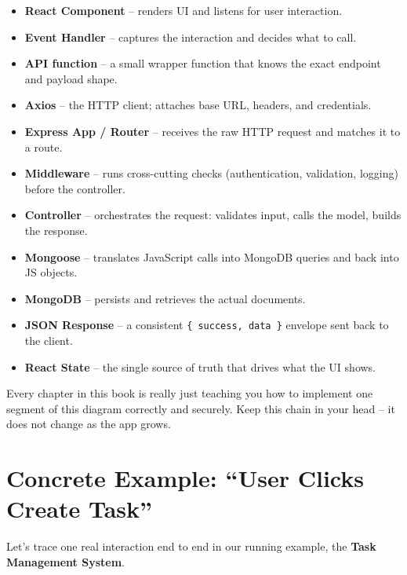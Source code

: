 \begin{itemize}
  \item \textbf{React Component} -- renders UI and listens for user interaction.
  \item \textbf{Event Handler} -- captures the interaction and decides what to call.
  \item \textbf{API function} -- a small wrapper function that knows the exact endpoint and payload shape.
  \item \textbf{Axios} -- the HTTP client; attaches base URL, headers, and credentials.
  \item \textbf{Express App / Router} -- receives the raw HTTP request and matches it to a route.
  \item \textbf{Middleware} -- runs cross-cutting checks (authentication, validation, logging) before the controller.
  \item \textbf{Controller} -- orchestrates the request: validates input, calls the model, builds the response.
  \item \textbf{Mongoose} -- translates JavaScript calls into MongoDB queries and back into JS objects.
  \item \textbf{MongoDB} -- persists and retrieves the actual documents.
  \item \textbf{JSON Response} -- a consistent \texttt{\{ success, data \}} envelope sent back to the client.
  \item \textbf{React State} -- the single source of truth that drives what the UI shows.
\end{itemize}

\begin{notebox}[NOTE]
Every chapter in this book is really just teaching you how to implement one
segment of this diagram correctly and securely. Keep this chain in your head
-- it does not change as the app grows.
\end{notebox}

\section{Concrete Example: ``User Clicks Create Task''}

Let's trace one real interaction end to end in our running example, the
\textbf{Task Management System}.

